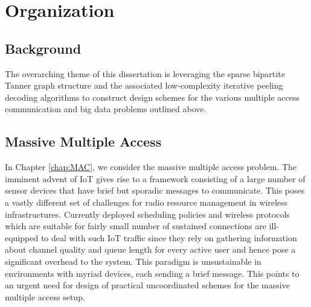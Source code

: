 \section{Organization}

\subsection*{Background}
The overarching theme of this dissertation is leveraging the sparse bipartite Tanner graph structure and the associated low-complexity iterative peeling decoding algorithms to construct design schemes for the various multiple access communication and big data problems outlined above. %


\subsection*{Massive Multiple Access}
In Chapter \ref{chap:MAC}, we consider the massive multiple access problem.  The imminent advent of IoT gives rise to a framework consisting of a large number of sensor devices that have brief but sporadic messages to communicate. This poses a vastly different set of challenges for radio resource management in wireless infrastructures. Currently deployed scheduling policies and wireless protocols which are suitable for fairly small number of sustained connections are ill-equipped to deal with such IoT traffic since they rely on gathering information about channel quality and queue length for every active user and hence pose a significant overhead to the system. This paradigm is unsustainable in environments with myriad devices, each sending a brief message.  This points to an urgent need for design of practical uncoordinated schemes for the massive multiple access setup. 

